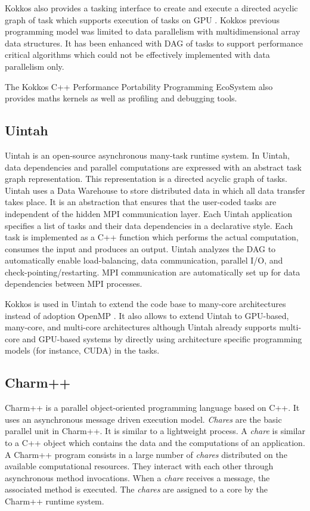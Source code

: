 Kokkos also provides a tasking interface to create and execute a directed acyclic graph of task which supports execution of tasks on GPU \cite{CartI2017}.
Kokkos previous programming model was limited to data parallelism with multidimensional array data structures.
It has been enhanced with DAG of tasks to support performance critical algorithms which could not be effectively implemented with data parallelism only.

The Kokkos C++ Performance Portability Programming EcoSystem also provides maths kernels as well as profiling and debugging tools.

\subsection{Uintah}
Uintah \cite{GeCPJ2000} \cite{HumpB2019} is an open-source asynchronous many-task runtime system.
In Uintah, data dependencies and parallel computations are expressed with an abstract task graph representation.
This representation is a directed acyclic graph of tasks.
Uintah uses a Data Warehouse to store distributed data in which all data transfer takes place.
It is an abstraction that ensures that the user-coded tasks are independent of the hidden MPI communication layer.
Each Uintah application specifies a list of tasks and their data dependencies in a declarative style.
Each task is implemented as a C++ function which performs the actual computation, consumes the input and produces an output.
Uintah analyzes the DAG to automatically enable load-balancing, data communication, parallel I/O, and check-pointing/restarting.
MPI communication are automatically set up for data dependencies between MPI processes.

Kokkos \cite{CarTS2014} is used in Uintah to extend the code base to many-core architectures instead of adoption OpenMP \cite{HPHSD2019}.
It also allows to extend Uintah to  GPU-based, many-core, and multi-core architectures although Uintah already supports  multi-core and GPU-based systems by directly using architecture specific programming models (for instance, CUDA) in the tasks.

\subsection{Charm++}
Charm++ \cite{KaleK1993} \cite{RobBK2016} is a parallel object-oriented programming language based on C++.
It uses an asynchronous message driven execution model.
\textit{Chares} are the basic parallel unit in Charm++.
It is similar to a lightweight process.
A \textit{chare} is similar to a C++ object which contains the data and the computations of an application.
A Charm++ program consists in a large number of \textit{chares} distributed on the available computational resources.
They interact with each other through asynchronous method invocations.
When a \textit{chare} receives a message, the associated method is executed.
The \textit{chares} are assigned to a core by the Charm++ runtime system.

